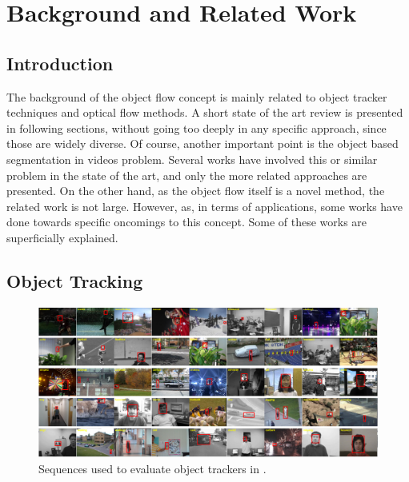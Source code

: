 \chapter{Background and Related Work} \label{chap:background}

\section{Introduction}

The background of the object flow concept is mainly related to object tracker techniques and optical flow methods. A short state of the art review is presented in 
following sections, without going too deeply in any specific approach, since those are widely diverse. Of course, another important point is the object based segmentation in videos problem. Several works have involved this or similar problem in 
the state of the art, and only the more related approaches are presented. On the other hand, as the object flow itself is a novel method, the related work is not large.
 However, as, in terms of applications, some works have done towards specific oncomings to this concept. Some of these works are superficially explained.

\section{Object Tracking}

   \begin{figure}[thpb]
      \centering
      \includegraphics[width=1.0\textwidth]{../images/tr_db.png}
      \caption{Sequences used to evaluate object trackers in \cite{c16}. }
      \label{tr_db}
   \end{figure}


